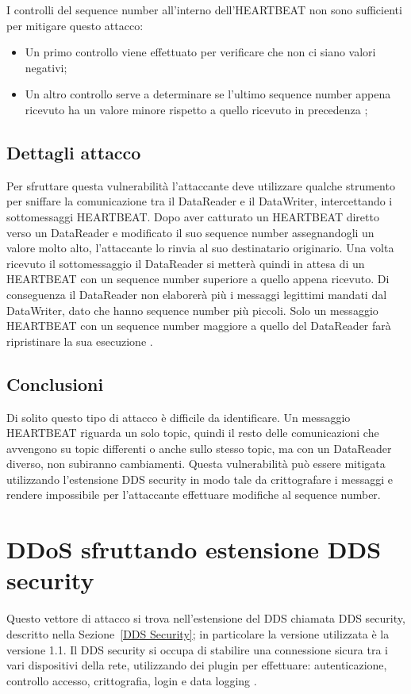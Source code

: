 I controlli del sequence number all'interno dell'HEARTBEAT 
non sono sufficienti per mitigare questo attacco:
\begin{itemize}
    \item Un primo controllo viene effettuato per verificare che non ci siano 
    valori negativi;
    \item Un altro controllo serve a determinare se l'ultimo sequence number
    appena ricevuto ha un valore minore rispetto a quello ricevuto in precedenza
    \cite{White2017AnII};
\end{itemize}


\subsection{Dettagli attacco}

Per sfruttare questa vulnerabilità l'attaccante deve utilizzare qualche 
strumento per sniffare la comunicazione tra il DataReader e il DataWriter,
intercettando i
sottomessaggi HEARTBEAT. Dopo aver catturato un HEARTBEAT diretto verso 
un DataReader e modificato 
il suo sequence number assegnandogli un valore molto alto, 
l'attaccante lo rinvia al suo destinatario originario.
Una volta ricevuto il sottomessaggio il DataReader si metterà quindi 
in attesa di un HEARTBEAT con un sequence number 
superiore a quello appena ricevuto. Di conseguenza il DataReader
non elaborerà più i messaggi legittimi mandati dal DataWriter,
dato che hanno sequence number più piccoli.
Solo un messaggio HEARTBEAT con un sequence number
maggiore a quello del DataReader farà ripristinare la sua esecuzione 
\cite{White2017AnII}.


\subsection{Conclusioni}
Di solito questo tipo di attacco è difficile da identificare. 
Un messaggio HEARTBEAT riguarda un solo topic, quindi il resto delle
comunicazioni che avvengono su topic differenti o anche sullo stesso 
topic, ma con un DataReader diverso, non subiranno cambiamenti.
Questa vulnerabilità può essere mitigata utilizzando l'estensione
DDS security in modo tale da crittografare i messaggi e rendere 
impossibile per l'attaccante effettuare modifiche al 
sequence number. 


\section{DDoS sfruttando estensione DDS security}
Questo vettore di attacco si trova nell'estensione del DDS chiamata
DDS security, descritto nella Sezione~\ref{DDS Security}; 
in particolare la versione utilizzata è la versione 1.1.
Il DDS security si occupa di stabilire una
connessione sicura tra i vari dispositivi della rete, utilizzando 
dei plugin per effettuare: autenticazione, controllo accesso, crittografia,
login e data logging \cite{ddssecurity1.1}.

